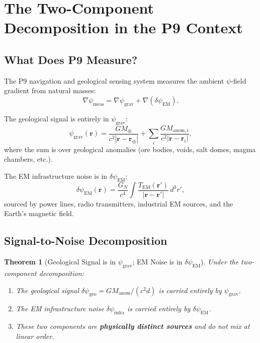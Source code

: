 \documentclass[11pt]{article}
\newtheorem{theorem}{Theorem}[section]
\theoremstyle{definition}
\theoremstyle{remark}
\newcommand{\psigrav}{\psi_{\mathrm{grav}}}
\newcommand{\dpsiem}{\delta\psi_{\mathrm{EM}}}
\newcommand{\GN}{G_N}
\begin{document}
\section{The Two-Component Decomposition in the P9 Context}
\label{sec:P9-decomp}

\subsection{What Does P9 Measure?}

The P9 navigation and geological sensing system measures the ambient
$\psi$-field gradient from natural masses:
\begin{equation}
\nabla\psi_{\mathrm{meas}} = \nabla\psigrav + \nabla(\dpsiem).
\label{eq:P9-gradient}
\end{equation}

The geological signal is entirely in $\psigrav$:
\begin{equation}
\psigrav(\mathbf{r}) = \frac{G M_\oplus}{c^2 |\mathbf{r} - \mathbf{r}_\oplus|}
+ \sum_i \frac{G M_{\mathrm{anom},i}}{c^2 |\mathbf{r} - \mathbf{r}_i|},
\label{eq:psi-grav-geo}
\end{equation}
where the sum is over geological anomalies (ore bodies, voids, salt domes,
magma chambers, etc.).

The EM infrastructure noise is in $\dpsiem$:
\begin{equation}
\dpsiem(\mathbf{r}) = \frac{\GN}{c^4} \int
\frac{T_{\mathrm{EM}}(\mathbf{r}')}{|\mathbf{r} - \mathbf{r}'|}
\,d^3r',
\label{eq:dpsiem-infra}
\end{equation}
sourced by power lines, radio transmitters, industrial EM sources, and
the Earth's magnetic field.

\subsection{Signal-to-Noise Decomposition}

\begin{theorem}[Geological Signal is in $\psigrav$; EM Noise is in $\dpsiem$]
\label{thm:P9-decomp}
Under the two-component decomposition:
\begin{enumerate}[nosep]
\item The geological signal $\delta\psi_{\mathrm{geo}} = G M_{\mathrm{anom}}/(c^2 d)$
  is carried entirely by $\psigrav$.
\item The EM infrastructure noise $\delta\psi_{\mathrm{infra}}$ is carried
  entirely by $\dpsiem$.
\item These two components are \textbf{physically distinct sources} and
  do not mix at linear order.
\end{enumerate}
\end{theorem}
\end{document}
